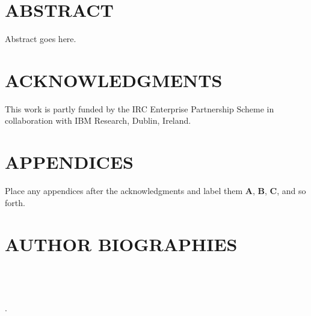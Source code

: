 \documentclass{wscpaperproc}
\theoremstyle{wsc}
\begin{document}
\maketitle

\section*{ABSTRACT}
Abstract goes here.  









\section*{ACKNOWLEDGMENTS}
This work is partly funded by the IRC Enterprise Partnership Scheme in collaboration with IBM Research, Dublin, Ireland.

\appendix
\section{APPENDICES} \label{app:quadratic}
Place any appendices after the acknowledgments and label them
\textbf{A}, \textbf{B}, \textbf{C}, and so forth.





\section*{AUTHOR BIOGRAPHIES}
 \\
 \\
 \\
.

\end{document}
